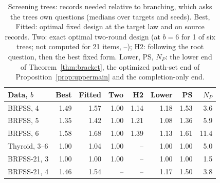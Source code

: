 \begin{table}[t]
\centering
\caption{Screening trees: records needed relative to branching, which asks the tree\textquotesingle s own questions (medians over targets and seeds). Best, Fitted: optimal fixed design at the target law and on source records. Two: exact optimal two-round design (at $b=6$ for 1 of six trees; not computed for 21 items, --); H2: following the root question, then the best fixed form. Lower, PS, $N_P$: the lower end of Theorem~\ref{thm:bracket}, the optimized path-set end of Proposition~\ref{prop:uppermain} and the completion-only end.}
\label{tab:screening}
\footnotesize
\setlength{\tabcolsep}{2.4pt}
\begin{tabular}{lrrrrrrr}
\toprule
Data, $b$ & Best & Fitted & Two & H2 & Lower & PS & $N_P$ \\
\midrule
BRFSS, 4 & 1.49 & 1.57 & 1.00 & 1.14 & 1.18 & 1.53 & 3.6 \\
BRFSS, 5 & 1.35 & 1.42 & 1.00 & 1.21 & 1.08 & 1.36 & 5.9 \\
BRFSS, 6 & 1.58 & 1.68 & 1.00 & 1.39 & 1.13 & 1.61 & 11.4 \\
Thyroid, 3--6 & 1.00 & 1.04 & 1.00 & -- & 1.00 & 1.00 & 5.0 \\
\addlinespace[2pt]
BRFSS-21, 3 & 1.00 & 1.00 & 1.00 & -- & 1.00 & 1.00 & 1.5 \\
BRFSS-21, 4 & 1.46 & 1.54 & -- & -- & 1.17 & 1.50 & 3.8 \\
\bottomrule
\end{tabular}
\end{table}
